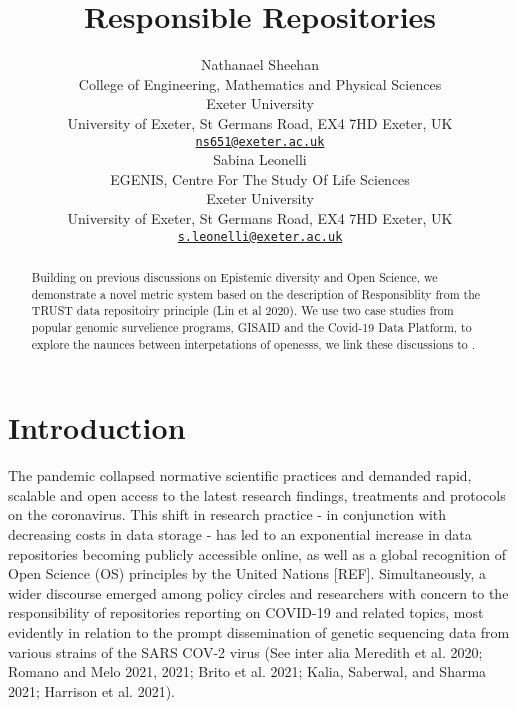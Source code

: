 \documentclass{article}
\title{Responsible Repositories}
\author{
    Nathanael Sheehan
   \\
    College of Engineering, Mathematics and Physical Sciences \\
    Exeter University \\
  University of Exeter, St Germans Road, EX4 7HD Exeter, UK \\
  \texttt{\href{mailto:ns651@exeter.ac.uk}{\nolinkurl{ns651@exeter.ac.uk}}} \\
   \And
    Sabina Leonelli
   \\
    EGENIS, Centre For The Study Of Life Sciences \\
    Exeter University \\
  University of Exeter, St Germans Road, EX4 7HD Exeter, UK \\
  \texttt{\href{mailto:s.leonelli@exeter.ac.uk}{\nolinkurl{s.leonelli@exeter.ac.uk}}} \\
  }
\begin{document}
\maketitle


\begin{abstract}
Building on previous discussions on Epistemic diversity and Open
Science, we demonstrate a novel metric system based on the description
of Responsiblity from the TRUST data repositoiry principle (Lin et al
2020). We use two case studies from popular genomic survelience
programs, GISAID and the Covid-19 Data Platform, to explore the naunces
between interpetations of openesss, we link these discussions to .
\end{abstract}


\hypertarget{introduction}{%
\section{Introduction}\label{introduction}}

The pandemic collapsed normative scientific practices and demanded
rapid, scalable and open access to the latest research findings,
treatments and protocols on the coronavirus. This shift in research
practice - in conjunction with decreasing costs in data storage - has
led to an exponential increase in data repositories becoming publicly
accessible online, as well as a global recognition of Open Science (OS)
principles by the United Nations {[}REF{]}. Simultaneously, a wider
discourse emerged among policy circles and researchers with concern to
the responsibility of repositories reporting on COVID-19 and related
topics, most evidently in relation to the prompt dissemination of
genetic sequencing data from various strains of the SARS COV-2 virus
(See inter alia Meredith et al. 2020; Romano and Melo 2021, 2021; Brito
et al. 2021; Kalia, Saberwal, and Sharma 2021; Harrison et al. 2021).
\end{document}
